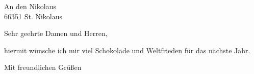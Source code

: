 \documentclass[version=last,fontsize=11pt,DIV=11,BCOR=10mm,parskip=full]{scrlttr2}
\begin{document}

\begin{letter}{
An den Nikolaus\\
66351 St. Nikolaus}

\opening{Sehr geehrte Damen und Herren,}

hiermit wünsche ich mir viel Schokolade und Weltfrieden für das nächste Jahr.

\closing{Mit freundlichen Grüßen}

\end{letter}
\end{document}
